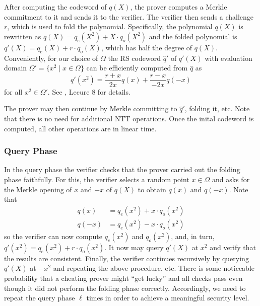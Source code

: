 \documentclass[final]{zamarep}
\begin{document}
After computing the codeword of $q(X)$, the prover computes a Merkle commitment to it and sends it to the verifier. The verifier then sends a challenge $r$, which is used to fold the polynomial. Specifically, the polynomial $q(X)$ is rewritten as $q(X) = q_e(X^2) + X \cdot q_o(X^2)$ and the folded polynomial is $q'(X) = q_e(X) + r \cdot q_o(X)$, which has half the degree of $q(X)$. Conveniently, for our choice of $\Omega$ the RS codeword $\hat q'$ of $q'(X)$ with evaluation domain $\Omega' = \{x^2 \mid x \in \Omega \} $ can be efficiently computed from $\hat q$ as
\[
  q'(x^2) = \frac{r + x}{2x} q(x) + \frac{r - x}{-2x} q(-x)
\]
for all $x^2 \in \Omega'$. See \cite{zkp_mooc}, Lecure 8 for details.

The prover may then continue by Merkle committing to $\hat q'$, folding it, etc. Note that there is no need for additional NTT operations. Once the inital codeword is computed, all other operations are in linear time.

\subsubsection{Query Phase}
\label{sec:query}
In the query phase the verifier checks that the prover carried out the folding phase faithfully. For this, the verifier selects a random point $x \in \Omega$ and asks for the Merkle opening of $x$ and $-x$ of $q(X)$ to obtain $q(x)$ and $q(-x)$. Note that
\begin{align*}
  q(x) &= q_e(x^2) + x \cdot q_o(x^2) \\
  q(-x) &= q_e(x^2) - x \cdot q_o(x^2)
\end{align*}
so the verifier can now compute $q_e(x^2)$ and $q_o(x^2)$, and, in turn, $q'(x^2) = q_e(x^2) + r \cdot q_o(x^2)$. It now may query $q'(X)$ at $x^2$ and verify that the results are consistent. Finally, the verifier continues recursively by querying $q'(X)$ at $-x^2$ and repeating the above procedure, etc. There is some noticeable probability that a cheating prover might ``get lucky'' and all checks pass even though it did not perform the folding phase correctly. Accordingly, we need to repeat 
the query phase $\ell$ times in order to achieve a meaningful security level.
\end{document}
